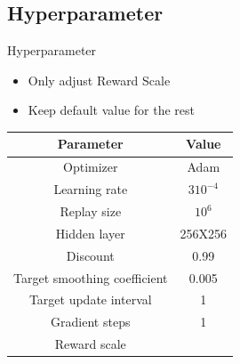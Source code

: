 \subsection{Hyperparameter}
\begin{frame}{Hyperparameter}
\begin{itemize}
    \item Only adjust Reward Scale
    \item Keep default value for the rest
\end{itemize}
\centering
 \begin{tabular}{| c|c | }
   \hline \hline
   Parameter & Value \\ \hline \hline
   Optimizer & Adam \\ \hline
   Learning rate & \(3 10^{-4}\) \\ \hline
   Replay size & \(10^6\) \\ \hline
   Hidden layer&   256X256  \\ \hline
   Discount & 0.99 \\ \hline
   Target smoothing coefficient & 0.005 \\ \hline
   Target update interval & 1 \\ \hline
   Gradient steps & 1 \\ \hline
   Reward scale & \color{blue}{1000} \\ \hline \hline
    \end{tabular}
\end{frame}
